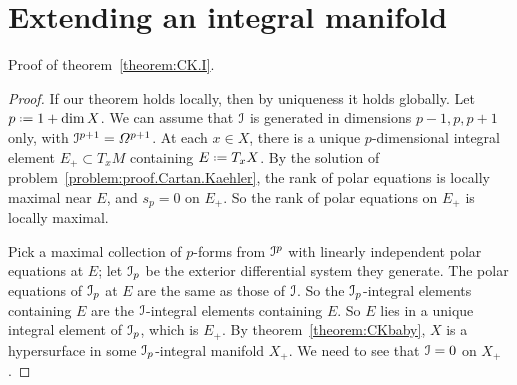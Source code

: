 \section{Extending an integral manifold}
Proof of theorem~\vref{theorem:CK.I}.
\begin{proof}
If our theorem holds locally, then by uniqueness it holds globally.
Let \(p\defeq1+\dim X\).
We can assume that \(\mathcal{I}\) is generated in dimensions \(p-1,p,p+1\) only, with \(\mathcal{I}^{p+1}=\Omega^{p+1}_{}\).
At each \(x\in X\), there is a unique \(p\)-dimensional integral element \(E_+ \subset T_x M\) containing \(E\defeq T_x X\).
By the solution of problem~\vref{problem:proof.Cartan.Kaehler}, the rank of polar equations is locally maximal near \(E\), and \(s_p=0\) on \(E_+\).
So the rank of polar equations on \(E_+\) is locally maximal.

Pick a maximal collection of \(p\)-forms from \(\mathcal{I}^p\) with linearly independent polar equations at \(E\); let \(\mathcal{I}_p\) be the exterior differential system they generate.
The polar equations of \(\mathcal{I}_p\) at \(E\) are the same as those of \(\mathcal{I}\).
So the \(\mathcal{I}_p\)-integral elements containing \(E\) are the \(\mathcal{I}\)-integral elements containing \(E\).
So \(E\) lies in a unique integral element of \(\mathcal{I}_p\), which is \(E_+\).
By theorem~\vref{theorem:CKbaby}, \(X\) is a hypersurface in some \(\mathcal{I}_p\)-integral manifold \(X_+\).
We need to see that \(\mathcal{I}=0\) on \(X_+\).


\end{proof}
